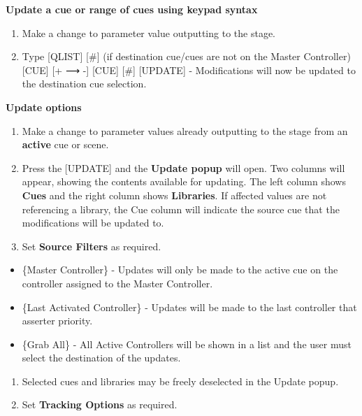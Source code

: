 \documentclass[
]{article}
\begin{document}
\textbf{Update a cue or range of cues using keypad syntax}

\begin{enumerate}
\def\labelenumi{\arabic{enumi}.}
\item
  Make a change to parameter value outputting to the stage.
\item
  Type {[}QLIST{]} {[}\#{]} (if destination cue/cues are not on the Master Controller) {[}CUE{]} {[}+ ⟶ -{]} {[}CUE{]} {[}\#{]} {[}UPDATE{]} - Modifications will now be updated to the destination cue selection.
\end{enumerate}

\textbf{Update options}

\begin{enumerate}
\def\labelenumi{\arabic{enumi}.}
\item
  Make a change to parameter values already outputting to the stage from an \textbf{active} cue or scene.
\item
  Press the {[}UPDATE{]} and the \textbf{Update popup} will open. Two columns will appear, showing the contents available for updating. The left column shows \textbf{Cues} and the right column shows \textbf{Libraries}. If affected values are not referencing a library, the Cue column will indicate the source cue that the modifications will be updated to.
\item
  Set \textbf{Source Filters} as required.
\end{enumerate}

\begin{itemize}
\item
  \{Master Controller\} - Updates will only be made to the active cue on the controller assigned to the Master Controller.
\item
  \{Last Activated Controller\} - Updates will be made to the last controller that asserter priority.
\item
  \{Grab All\} - All Active Controllers will be shown in a list and the user must select the destination of the updates.
\end{itemize}

\begin{enumerate}
\def\labelenumi{\arabic{enumi}.}
\setcounter{enumi}{3}
\item
  Selected cues and libraries may be freely deselected in the Update popup.
\item
  Set \textbf{Tracking Options} as required.
\end{enumerate}
\end{document}
